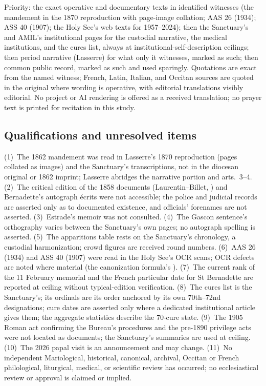 Priority: the exact operative and documentary texts in
identified witnesses (the mandement in the 1870 reproduction
with page-image collation; AAS 26 (1934); ASS 40 (1907); the
Holy See's web texts for 1957--2024); then the Sanctuary's and
AMIL's institutional pages for the custodial narrative, the
medical institutions, and the cures list, always at
institutional-self-description ceilings; then period narrative
(Lasserre) for what only it witnesses, marked as such; then
common public record, marked as such and used sparingly.
Quotations are exact from the named witness; French, Latin,
Italian, and Occitan sources are quoted in the original where
wording is operative, with editorial translations visibly
editorial. No project or AI rendering is offered as a received
translation; no prayer text is printed for recitation in this
study.

\subsection*{Qualifications and unresolved items}

(1)~The 1862 mandement was read in Lasserre's 1870 reproduction
(pages collated as images) and the Sanctuary's transcriptions,
not in the diocesan original or 1862 imprint; Lasserre abridges
the narrative portion and arts.~3--4. (2)~The critical edition
of the 1858 documents (Laurentin--Billet, ) and Bernadette's autograph \'ecrits were not
accessible; the police and judicial records are asserted only as
to documented existence, and officials' forenames are not
asserted. (3)~Estrade's memoir was not consulted. (4)~The Gascon
sentence's orthography varies between the Sanctuary's own pages;
no autograph spelling is asserted. (5)~The apparitions table
rests on the Sanctuary's chronology, a custodial harmonization;
crowd figures are received round numbers. (6)~AAS 26 (1934) and
ASS 40 (1907) were read in the Holy See's OCR scans; OCR defects
are noted where material (the canonization formula's
). (7)~The current rank of the 11 February
memorial and the French particular date for St Bernadette are
reported at ceiling without typical-edition verification.
(8)~The cures list is the Sanctuary's; its ordinals are its
order anchored by its own 70th--72nd designations; cure dates
are asserted only where a dedicated institutional article gives
them; the aggregate statistics describe the 70-cure state.
(9)~The 1905 Roman act confirming the Bureau's procedures and
the pre-1890 privilege acts were not located as documents; the
Sanctuary's summaries are used at ceiling. (10)~The 2026 papal
visit is an announcement and may change. (11)~No independent
Mariological, historical, canonical, archival, Occitan or French
philological, liturgical, medical, or scientific review has
occurred; no ecclesiastical review or approval is claimed or
implied.

